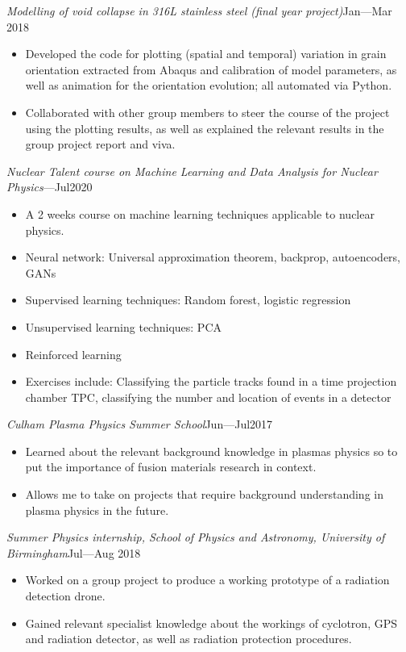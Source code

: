 \documentclass[a4paper, 12pt]{article}
\newcommand{\expentry}[3]{\emph{#1}\hfill{#2}---{#3}}
\begin{document}
\expentry{Modelling of void collapse in 316L stainless steel (final year project)}{Jan}{Mar 2018}
    \begin{itemize}
    \setlength\itemsep{0em}
    \item Developed the code for plotting (spatial and temporal) variation in grain orientation extracted from Abaqus and calibration of model parameters, as well as animation for the orientation evolution; all automated via Python.
    \item Collaborated with other group members to steer the course of the project using the plotting results, as well as explained the relevant results in the group project report and viva.
    \end{itemize}
\expentry{Nuclear Talent course on Machine Learning and Data Analysis for Nuclear Physics}{}{Jul2020}
    \begin{itemize}
    \item A 2 weeks course on machine learning techniques applicable to nuclear physics.
    \item Neural network: Universal approximation theorem, backprop, autoencoders, GANs
    \item Supervised learning techniques: Random forest, logistic regression
    \item Unsupervised learning techniques: PCA
    \item Reinforced learning
    \item Exercises include: Classifying the particle tracks found in a time projection chamber TPC, classifying the number and location of events in a detector
    \end{itemize}
\expentry{Culham Plasma Physics Summer School}{Jun}{Jul2017}
    \begin{itemize}
    \setlength\itemsep{0em}
    \item Learned about the relevant background knowledge in plasmas physics so to put the importance of fusion materials research in context.
    \item Allows me to take on projects that require background understanding in plasma physics in the future.
    \end{itemize}
\expentry{Summer Physics internship, School of Physics and Astronomy, University of Birmingham}{Jul}{Aug 2018}
    \begin{itemize}
    \setlength\itemsep{0em}
    \item Worked on a group project to produce a working prototype of a radiation detection drone.
    \item Gained relevant specialist knowledge about the workings of cyclotron, GPS and radiation detector, as well as radiation protection procedures.
    \end{itemize}
\end{document}
